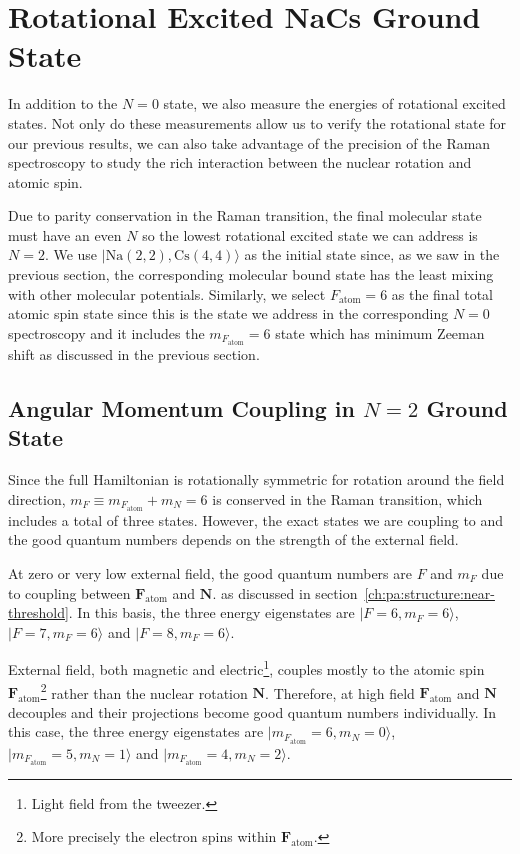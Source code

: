 \section{Rotational Excited NaCs Ground State}
\label{ch:raman-spectroscopy:n2}

In addition to the $N=0$ state, we also measure the energies of rotational excited states.
Not only do these measurements allow us to verify the rotational state for our previous results,
we can also take advantage of the precision of the Raman spectroscopy
to study the rich interaction between the nuclear rotation and atomic spin.

Due to parity conservation in the Raman transition,
the final molecular state must have an even $N$
so the lowest rotational excited state we can address is $N=2$.
We use $|\mathrm{Na(2, 2),Cs(4, 4)}\rangle$ as the initial state since,
as we saw in the previous section, the corresponding molecular bound state
has the least mixing with other molecular potentials.
Similarly, we select $F_{\mathrm{atom}}=6$ as the final total atomic spin state
since this is the state we address in the corresponding $N=0$ spectroscopy and
it includes the $m_{F_{\mathrm{atom}}}=6$ state which has minimum
Zeeman shift as discussed in the previous section.

\subsection{Angular Momentum Coupling in \texorpdfstring{$N=2$}{N=2} Ground State}
\label{ch:raman-spectroscopy:n2:angular-momentum}

Since the full Hamiltonian is rotationally symmetric for rotation around the field direction,
$m_F\equiv m_{F_{\mathrm{atom}}}+m_{N}=6$ is conserved in the Raman transition,
which includes a total of three states.
However, the exact states we are coupling to and the good quantum numbers depends on
the strength of the external field.

At zero or very low external field, the good quantum numbers are $F$ and $m_F$
due to coupling between $\mathbf{F}_{\mathrm{atom}}$ and $\mathbf{N}$.
as discussed in section~\ref{ch:pa:structure:near-threshold}.
In this basis, the three energy eigenstates are
$|F=6,m_F=6\rangle$, $|F=7,m_F=6\rangle$ and $|F=8,m_F=6\rangle$.

External field, both magnetic and electric\footnote{Light field from the tweezer.},
couples mostly to the atomic spin $\mathbf{F}_{\mathrm{atom}}$\footnote{
  More precisely the electron spins within $\mathbf{F}_{\mathrm{atom}}$.}
rather than the nuclear rotation $\mathbf{N}$.
Therefore, at high field $\mathbf{F}_{\mathrm{atom}}$ and $\mathbf{N}$
decouples and their projections become good quantum numbers individually.
In this case, the three energy eigenstates are
$|m_{F_\mathrm{atom}}=6,m_N=0\rangle$, $|m_{F_\mathrm{atom}}=5,m_N=1\rangle$ and
$|m_{F_\mathrm{atom}}=4,m_N=2\rangle$.

